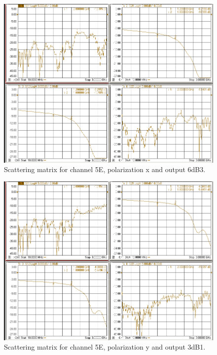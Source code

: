 \documentclass[12pt,a4paper,oneside]{article}
\begin{document}
\begin{figure}[H]
\centering
\includegraphics[width=0.9\linewidth]{VNA_results/5Ex_6dB3.png}
\caption{Scattering matrix for channel 5E, polarization x and output 6dB3.}
\label{fig:5Ex_6dB3}
\end{figure}


\begin{figure}[H]
\centering
\includegraphics[width=0.9\linewidth]{VNA_results/5Ey_3dB1.png}
\caption{Scattering matrix for channel 5E, polarization y and output 3dB1.}
\label{fig:5Ey_3dB1}
\end{figure}
\end{document}
